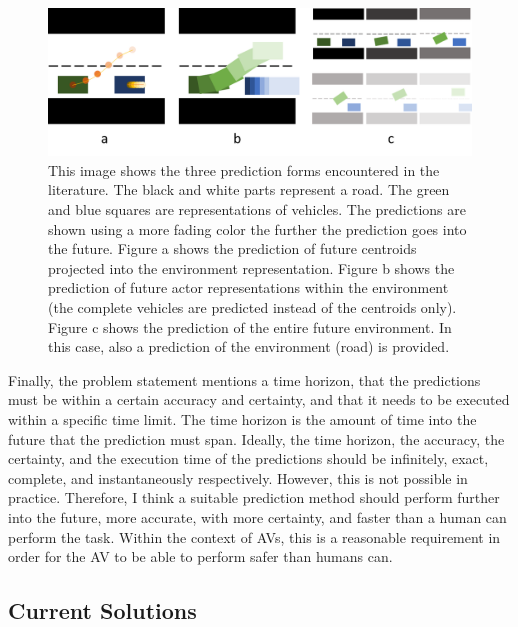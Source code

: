 \begin{figure}[h!]
	\centering
	\includegraphics[width=0.8\linewidth]{Figures/Introduction/Prediction_forms}
	\caption{This image shows the three prediction forms encountered in the literature. The black and white parts represent a road. The green and blue squares are representations of vehicles. The predictions are shown using a more fading color the further the prediction goes into the future. Figure a shows the prediction of future centroids projected into the environment representation. Figure b shows the prediction of future actor representations within the environment (the complete vehicles are predicted instead of the centroids only). Figure c shows the prediction of the entire future environment. In this case, also a prediction of the environment (road) is provided.}  
	\label{fig:pred_froms}
\end{figure}

Finally, the problem statement mentions a time horizon, that the predictions must be within a certain accuracy and certainty, and that it needs to be executed within a specific time limit. The time horizon is the amount of time into the future that the prediction must span. Ideally, the time horizon, the accuracy, the certainty, and the execution time of the predictions should be infinitely, exact, complete, and instantaneously respectively. However, this is not possible in practice. Therefore, I think a suitable prediction method should perform further into the future, more accurate, with more certainty, and faster than a human can perform the task. Within the context of \glspl{AV}, this is a reasonable requirement in order for the \gls{AV} to be able to perform safer than humans can.   


\subsection{Current Solutions}

